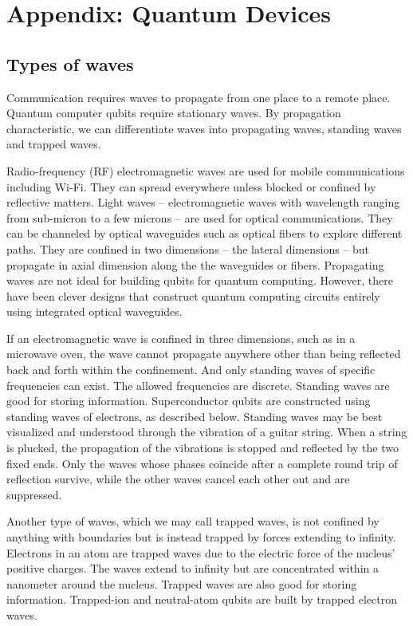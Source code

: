 \documentclass[oneside, letter, 12pt]{book}
\begin{document}
\chapter*{Appendix: Quantum Devices}\label{A-qubit}
\section{Types of waves}
Communication requires waves to propagate from one place to a remote place. Quantum computer qubits require stationary waves. By propagation characteristic, we can differentiate waves into propagating waves, standing waves and trapped waves.

Radio-frequency (RF) electromagnetic waves are used for mobile communications including Wi-Fi. They can spread everywhere unless blocked or confined by reflective matters. Light waves -- electromagnetic waves with wavelength ranging from sub-micron to a few microns -- are used for optical communications. They can be channeled by optical waveguides such as optical fibers to explore different paths. They are confined in two dimensions -- the lateral dimensions -- but propagate in axial dimension along the the waveguides or fibers. Propagating waves are not ideal for building qubits for quantum computing. However, there have been clever designs that construct quantum computing circuits entirely using integrated optical waveguides.

If an electromagnetic wave is confined in three dimensions, such as in a microwave oven, the wave cannot propagate anywhere other than being reflected back and forth within the confinement. And only standing waves of specific frequencies can exist. The allowed frequencies are discrete. Standing waves are good for storing information. Superconductor qubits are constructed using standing waves of electrons, as described below. Standing waves may be best visualized and understood through the vibration of a guitar string. When a string is plucked, the propagation of the vibrations is stopped and reflected by the two fixed ends. Only the waves whose phases coincide after a complete round trip of reflection survive, while the other waves cancel each other out and are suppressed.

Another type of waves, which we may call trapped waves, is not confined by anything with boundaries but is instead trapped by forces extending to infinity. Electrons in an atom are trapped waves due to the electric force of the nucleus' positive charges. The waves extend to infinity but are concentrated within a nanometer around the nucleus. Trapped waves are also good for storing information. Trapped-ion and neutral-atom qubits are built by trapped electron waves.
\end{document}

